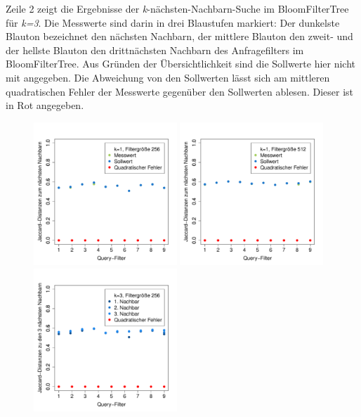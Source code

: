 Zeile 2 zeigt die Ergebnisse der \textit{k}-nächsten-Nachbarn-Suche im BloomFilterTree für \textit{k=3}. Die Messwerte sind darin in drei Blaustufen markiert: Der dunkelste Blauton bezeichnet den nächsten Nachbarn, der mittlere Blauton den zweit- und der hellste Blauton den drittnächsten Nachbarn des Anfragefilters im BloomFilterTree. Aus Gründen der Übersichtlichkeit sind die Sollwerte hier nicht mit angegeben. Die Abweichung von den Sollwerten lässt sich am mittleren quadratischen Fehler der Messwerte gegenüber den Sollwerten ablesen. Dieser ist in Rot angegeben. 
\begin{figure}[hpbt]
	\centering
	\label{fig:quality}
 	\includegraphics[width=0.48\textwidth]{pictures/nn_256.pdf}
 	\hspace{0.01\textwidth}
 	\includegraphics[width=0.48\textwidth]{pictures/nn_512.pdf}\\[0pt]
	\includegraphics[width=0.48\textwidth]{pictures/nn3_256-2.pdf}

\end{figure}
